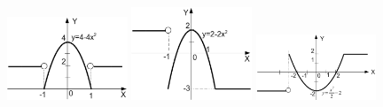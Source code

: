 \begin{figure}%
\begin{floatrow}[3]
{\includegraphics[width=0.32\textwidth,keepaspectratio]{img/ris_3_54}}
{\includegraphics[width=0.32\textwidth,keepaspectratio]{img/ris_3_55}}
{\includegraphics[width=0.32\textwidth,keepaspectratio]{img/ris_3_56}}
\end{floatrow}
\end{figure}%

